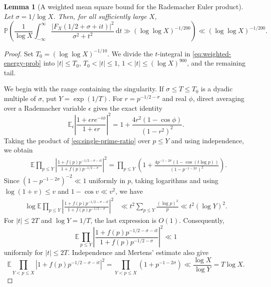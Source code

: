 \documentclass[a4paper,12pt,reqno]{amsart}
\numberwithin{equation}{section}
\newtheorem{lemma}[theorem]{Lemma}
\theoremstyle{remark}
\newcommand{\E}{\mathbb{E}}
\newcommand{\p}{\mathbb{P}}
\begin{document}
\begin{lemma}[A weighted mean square bound for the Rademacher Euler product]
\label{lem:weighted-squarefree-energy}
Let $\sigma=1/\log X$.  Then, for all sufficiently large
$X$,
\begin{equation}\label{eq:weighted-energy-prob}
 \p\left(
 \frac1{\log X}\int_{-\infty}^{\infty}
 \frac{|F_X(1/2+\sigma+it)|^2}{\sigma^2+t^2}\,\mathrm{d}t
 \gg (\log\log X)^{-1/200}\right)\ll (\log\log X)^{-1/200}.
\end{equation}
\end{lemma}



\begin{proof}
Set $T_0=(\log\log X)^{-1/10}$.  We divide the $t$-integral in
\eqref{eq:weighted-energy-prob} into $|t|\leq T_0$, $T_0<|t|\leq1$,
$1<|t|\leq(\log X)^{900}$, and the remaining tail.

We begin with the range containing the singularity. If
$\sigma\leq T\leq T_0$ is a dyadic multiple of $\sigma$, put
$Y=\exp(1/T)$.
For $r=p^{-1/2-\sigma}$ and real $\phi$, direct averaging over a Rademacher
variable $\epsilon$ gives the exact identity
\begin{equation}\label{eq:single-prime-ratio}
 \E_{\epsilon}\left|
 \frac{1+\epsilon r e^{-i\phi}}{1+\epsilon r}
 \right|^2
 =1+\frac{4r^2(1-\cos\phi)}{(1-r^2)^2}.
\end{equation}
Taking the product of \eqref{eq:single-prime-ratio} over $p\leq Y$ and
using independence, we obtain
\[
 \begin{aligned}
 &\E\prod_{p\leq Y}\left|
 \frac{1+f(p)p^{-1/2-\sigma-it}}
 {1+f(p)p^{-1/2-\sigma}}
 \right|^2=
 \prod_{p\leq Y}
 \left(
 1+
 \frac{4p^{-1-2\sigma}(1-\cos(t\log p))}
 {(1-p^{-1-2\sigma})^2}
 \right).
 \end{aligned}
\]
Since $(1-p^{-1-2\sigma})^{-2}\ll1$ uniformly in $p$, taking logarithms
and using $\log(1+v)\leq v$ and $1-\cos v\ll v^2$, we have
\[
 \begin{aligned}
 \log\E\prod_{p\leq Y}\left|
 \frac{1+f(p)p^{-1/2-\sigma-it}}
 {1+f(p)p^{-1/2-\sigma}}
 \right|^2
 &\ll
 t^2\sum_{p\leq Y}\frac{(\log p)^2}{p}\ll t^2(\log Y)^2.
 \end{aligned}
\]
For $|t|\leq2T$ and $\log Y=1/T$, the last expression is $O(1)$.
Consequently,
\begin{equation}\label{eq:short-ratio}
 \E\prod_{p\leq Y}\left|
 \frac{1+f(p)p^{-1/2-\sigma-it}}
 {1+f(p)p^{-1/2-\sigma}}
 \right|^2
 \ll1
\end{equation}
uniformly for $|t|\leq2T$.
Independence and Mertens' estimate also
give
\begin{equation}\label{eq:long-product-second-moment}
 \E\prod_{Y<p\leq X}|1+f(p)p^{-1/2-\sigma-it}|^2
 =\prod_{Y<p\leq X}(1+p^{-1-2\sigma})
 \ll\frac{\log X}{\log Y}=T\log X.
\end{equation}


\end{proof}
\end{document}
